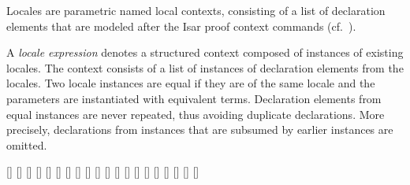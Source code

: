 \begin{isabellebody}
\begin{isamarkuptext}
\begin{description}
  \end{description}%
\end{isamarkuptext}%
\isamarkuptrue%
%
\isamarkuptrue%
%
\begin{isamarkuptext}%
Locales are parametric named local contexts, consisting of a list of
  declaration elements that are modeled after the Isar proof context
  commands (cf.\ ).%
\end{isamarkuptext}%
\isamarkuptrue%
%
\isamarkuptrue%
%
\begin{isamarkuptext}%
A \emph{locale expression} denotes a structured context composed of
  instances of existing locales.  The context consists of a list of
  instances of declaration elements from the locales.  Two locale
  instances are equal if they are of the same locale and the
  parameters are instantiated with equivalent terms.  Declaration
  elements from equal instances are never repeated, thus avoiding
  duplicate declarations.  More precisely, declarations from instances
  that are subsumed by earlier instances are omitted.

  \begin{railoutput}
\rail@plus
{}[]
[]
\rail@endplus
\rail@bar
{}
[]
\rail@plus
{}[]
[]
\rail@endplus
\rail@endbar
\rail@end
{}
\rail@bar
{}
[]
[]
\rail@endbar
{}[]
\rail@bar
{}[]
[]
\rail@endbar
\rail@end
{}
[]
\rail@bar
{}
\rail@bar
{}[]
[]
\rail@endbar
\rail@endbar
\rail@end
{}
\rail@plus
{}
\rail@bar
{}[]
[]
\rail@endbar
\rail@endplus
\rail@end
{}
[]
\rail@plus
{}[]
[]
[]
[]
\rail@endplus
\rail@end
\end{railoutput}



\end{isamarkuptext}
\end{isabellebody}
